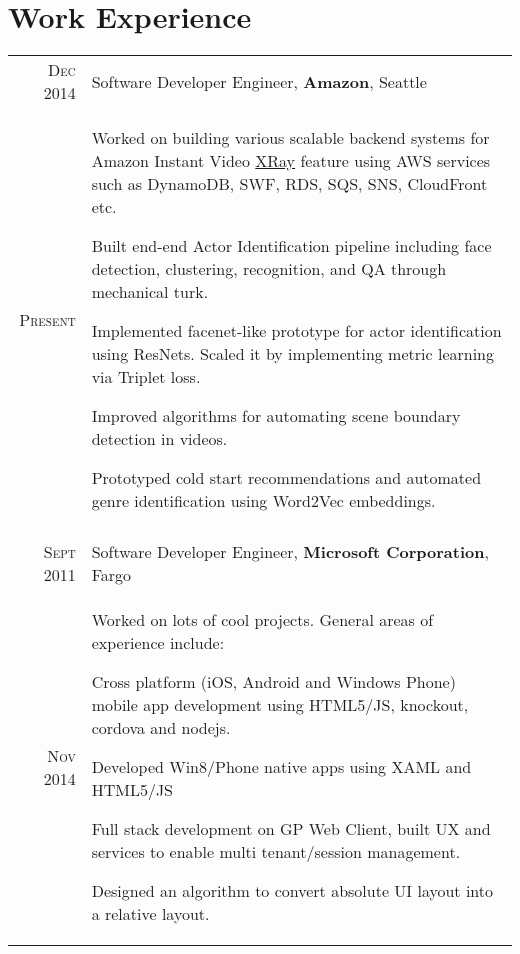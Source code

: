 \documentclass[a4paper,11pt]{article}
\begin{document}
\section{Work Experience}
\begin{longtable}{r|p{12.5cm}}
 \textsc{Dec 2014} & Software Developer Engineer, \normalsize   \textbf{Amazon}, Seattle \\
 \textsc{Present} & \footnotesize{\begin{minipage}[t]{12.5cm} Worked on building various scalable backend systems for Amazon Instant Video \href{http://www.wired.com/2015/04/amazon-xray-fire-tv/}{XRay} feature using  AWS services such as DynamoDB, SWF, RDS, SQS, SNS, CloudFront etc.
 \begin{compactitem}
    \item Built end-end Actor Identification pipeline including face detection, clustering, recognition, and QA through mechanical turk.
    \item Implemented facenet-like prototype for actor identification using ResNets. Scaled it by implementing metric learning via Triplet loss.
    \item Improved algorithms for automating scene boundary detection in videos.
    \item Prototyped cold start recommendations and automated genre identification using Word2Vec embeddings.
\end{compactitem}
 \end{minipage}}
 \\
 \multicolumn{2}{c}{}
 \\
 \textsc{Sept 2011} & Software Developer Engineer, \normalsize \textbf{Microsoft Corporation}, Fargo \\
 \textsc{Nov 2014} & \footnotesize{\begin{minipage}[t]{12.5cm} Worked on lots of cool projects. General areas of experience include:
 \begin{compactitem}
    \item Cross platform (iOS, Android and Windows Phone) mobile app development using HTML5/JS, knockout, cordova and nodejs.
    \item Developed Win8/Phone native apps using XAML and HTML5/JS
    \item Full stack development on GP Web Client, built UX and services to enable multi tenant/session management.
    \item Designed an algorithm to convert absolute UI layout into a relative layout.
\end{compactitem}

\end{minipage}}
\end{longtable}
\end{document}
